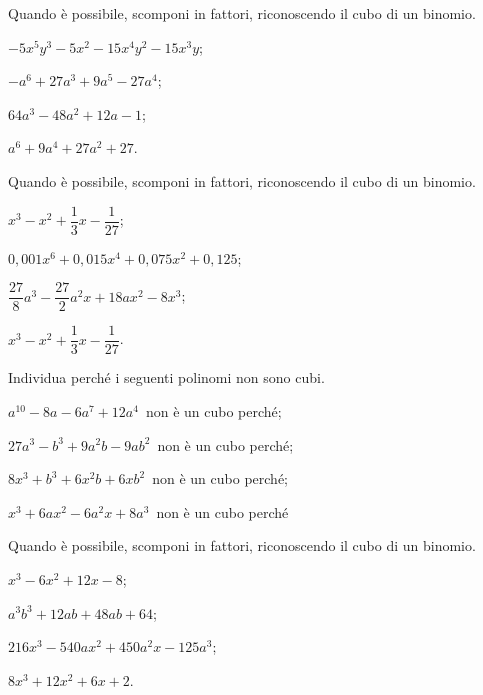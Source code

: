 \begin{esercizio}
\label{ese:13.53}
Quando è possibile, scomponi in fattori, riconoscendo il cubo di un binomio.
\begin{multicols}{2}
\begin{enumeratea}
 \item $-5x^{5}y^{3}-5x^{2}-15x^{4}y^{2}-15x^{3}y$;
 \item $-a^{6}+27a^{3}+9a^{5}-27a^{4}$;
 \item $64a^{3}-48a^{2}+12a-1$;
 \item $a^{6}+9a^{4}+27a^{2}+27$.
\end{enumeratea}
\end{multicols}
\end{esercizio}

\begin{esercizio}
\label{ese:13.54}
Quando è possibile, scomponi in fattori, riconoscendo il cubo di un binomio.
\begin{multicols}{2}
\begin{enumeratea}
 \item $x^{3}-x^{2}+\dfrac{1}{3}x-\dfrac{1}{27}$;
 \item $0,001x^{6}+0,015x^{4}+0,075x^{2}+0,125$;
 \item $\dfrac{27}{8}a^{3}-\dfrac{27}{2}a^{2}x+18ax^{2}-8x^{3}$;
 \item $x^{3}-x^{2}+\dfrac{1}{3}x-\dfrac{1}{27}$.
\end{enumeratea}
\end{multicols}
\end{esercizio}

\begin{esercizio}
\label{ese:13.55}
Individua perché i seguenti polinomi non sono cubi.
\begin{enumeratea}
 \item $a^{10}-8a-6a^{7}+12a^{4}$\, non è un cubo perché\dotfill;
 \item $27a^{3}-b^{3}+9a^{2}b-9ab^{2}$\, non è un cubo perché\dotfill;
 \item $8x^{3}+b^{3}+6x^{2}b+6{xb}^{2}$\, non è un cubo perché\dotfill;
 \item $x^{3}+6ax^{2}-6a^{2}x+8a^{3}$\, non è un cubo perché\dotfill
\end{enumeratea}
\end{esercizio}

\begin{esercizio}
\label{ese:13.56}
Quando è possibile, scomponi in fattori, riconoscendo il cubo di un binomio.
\begin{multicols}{2}
\begin{enumeratea}
 \item $x^{3}-6x^{2}+12x-8$;
 \item $a^{3}b^{3}+12ab+48ab+64$;
 \item $216x^{3}-540ax^{2}+450a^{2}x-125a^{3}$;
 \item $8x^{3}+12x^{2}+6x+2$.
\end{enumeratea}
\end{multicols}
\end{esercizio}

